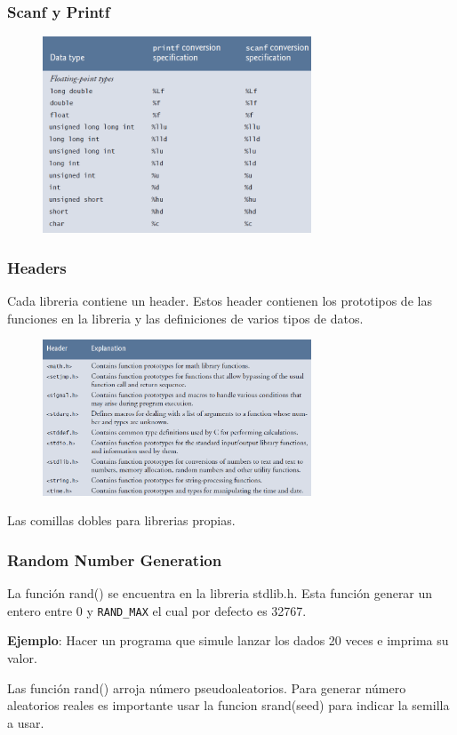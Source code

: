 \documentclass[10.5pt,scale=1.0,t,aspectratio=169,hyperref={pdfpagelabels=false}]{beamer}
\begin{document}
\begin{frame}
	\frametitle{Scanf y Printf}
	\begin{figure}
		\centering
		\includegraphics[width=8cm]{PrintfScanf}
	\end{figure}
	
\end{frame}
\begin{frame}
	\frametitle{Headers}
	Cada libreria contiene un header. Estos header contienen los prototipos de las funciones en la libreria y las definiciones de varios tipos de datos. 
	\begin{figure}
		\centering
		\includegraphics[width=8cm]{Headers}
	\end{figure}
	Las comillas dobles para librerias propias.
\end{frame}
\begin{frame}
	\frametitle{Random Number Generation}
	La función rand() se encuentra en la libreria stdlib.h. Esta función generar un entero entre 0 y \texttt{RAND\_MAX} el cual por defecto es 32767.
	
	\textbf{Ejemplo}: Hacer un programa que simule lanzar los dados 20 veces e imprima su valor.
	
	Las función rand() arroja número pseudoaleatorios. Para generar número aleatorios reales es importante usar la funcion srand(seed) para indicar la semilla a usar.
\end{frame}
\end{document}
